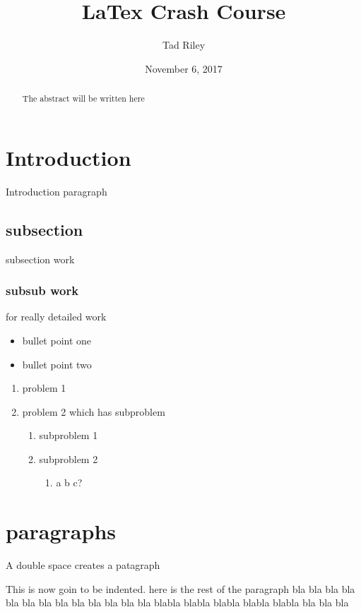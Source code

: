 \documentclass[12pt]{article}
\title{LaTex Crash Course}
\author{Tad Riley}
\date{November 6, 2017}
\begin{document}
\maketitle

\newpage
\tableofcontents
\newpage

\begin{abstract}
The abstract will be written here
\end{abstract}

\section{Introduction} %
Introduction paragraph
\label{sec:intro}


\subsection{subsection} %
subsection work

\subsubsection{subsub work} %
for really detailed work

\begin{itemize}
\item bullet point one
\item bullet point two
\end{itemize}

\begin{enumerate}
\item problem 1
\item problem 2 which has subproblem
	\begin{enumerate}
	\item subproblem 1
	\item subproblem 2
		\begin{enumerate}
		\item a b c?
		\end{enumerate}
	\end{enumerate}
\end{enumerate}


\section{paragraphs} %
A double space creates a patagraph

This is now goin to be indented. here is the rest of the paragraph bla bla bla bla bla bla bla bla bla bla bla bla bla blabla blabla blabla blabla blabla bla bla bla 
\end{document}
